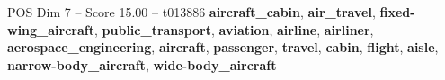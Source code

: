 \begin{textsample}{POS Dim 7 – Score 15.00 – t013886}  \label{ex:f7_pos_038}
\textbf{aircraft\_cabin}, \textbf{air\_travel}, \textbf{fixed-wing\_aircraft}, \textbf{public\_transport}, \textbf{aviation}, \textbf{airline}, \textbf{airliner}, \textbf{aerospace\_engineering}, \textbf{aircraft}, \textbf{passenger}, \textbf{travel}, \textbf{cabin}, \textbf{flight}, \textbf{aisle}, \textbf{narrow-body\_aircraft}, \textbf{wide-body\_aircraft}

\end{textsample}

